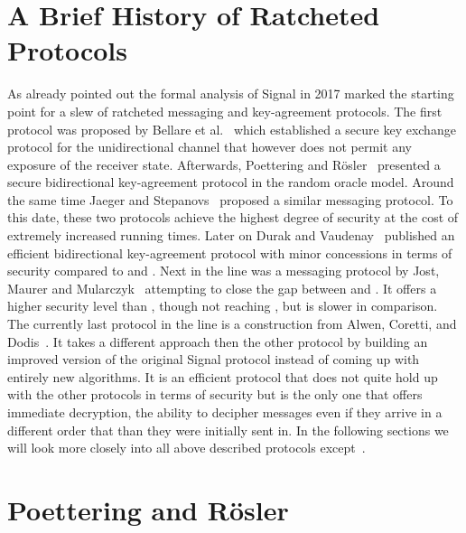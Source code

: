 \documentclass[11pt,a4paper,twoside,openright,bibliography=totoc]{scrbook}
\begin{document}
\section{A Brief History of Ratcheted Protocols}
\label{sec:brief-hist-ratch}

As already pointed out the formal analysis of Signal in 2017 marked the
starting point for a slew of ratcheted messaging and key-agreement
protocols. The first protocol was proposed by Bellare et
al.~\cite{bellare2017ratcheted} which established a secure key
exchange protocol for the unidirectional channel that however does not
permit any exposure of the receiver state. Afterwards, Poettering and
Rösler~\cite{poettering2018towards} presented a secure bidirectional
key-agreement protocol in the random oracle model. Around the same
time Jaeger and Stepanovs~\cite{jaeger2018optimal} proposed a similar
messaging protocol. To this date, these two protocols achieve the
highest degree of security at the cost of extremely increased running
times.  Later on Durak and Vaudenay~\cite{durak2018bidirectional}
published an efficient bidirectional key-agreement protocol with minor
concessions in terms of security compared to
\cite{poettering2018towards} and \cite{jaeger2018optimal}.  Next in
the line was a messaging protocol by Jost, Maurer and
Mularczyk~\cite{jostefficient} attempting to close the gap between
\cite{durak2018bidirectional} and
\cite{poettering2018towards,jaeger2018optimal}. It offers a higher
security level than \cite{durak2018bidirectional}, though not reaching
\cite{poettering2018towards,jaeger2018optimal}, but is slower in
comparison. The currently last protocol in the line is a construction
from Alwen, Coretti, and Dodis~\cite{alwen2018double}. It takes
a different approach then the other protocol by building an
improved version of the original Signal protocol instead of
coming up with entirely new algorithms. It is an efficient protocol
that does not quite hold up with the other protocols in terms of
security but is the only one that offers immediate decryption,
the ability to decipher messages even if they arrive in
a different order that than they were initially sent in.
In the following sections we will look more closely into all
above described protocols except~\cite{bellare2017ratcheted}.

\section[Poettering and Rösler]
{Poettering and Rösler~\cite{poettering2018towards}}
\label{sec:poettering-roesler}
\end{document}
